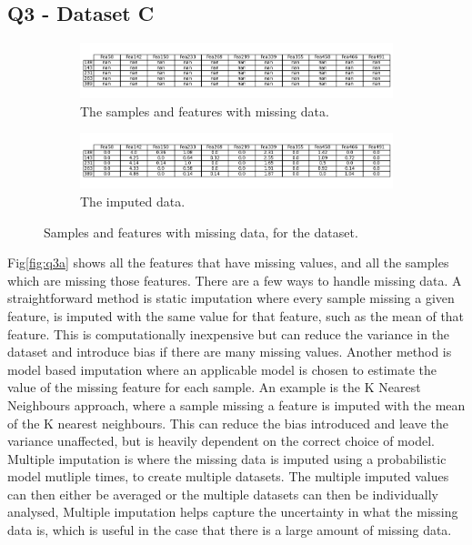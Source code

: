 
\subsection{Q3 - Dataset C}\label{subsec:dataset-c}
    \begin{figure}
    \centering
    \begin{subfigure}{0.9\textwidth}
        \centering
        \includegraphics[width=1\textwidth]{./figures/q3a}
        \caption{The samples and features with missing data.}
        \label{fig:q3a}
    \end{subfigure}%
    \hfill
    \begin{subfigure}{0.9\textwidth}
        \centering
        \includegraphics[width=1\textwidth]{./figures/q3c_1}
        \caption{The imputed data.}
        \label{fig:q3c}
    \end{subfigure}
    \caption{Samples and features with missing data, for the  dataset.}
    \label{fig:q3ac}
    \end{figure}

    Fig\eqref{fig:q3a} shows all the features that have missing values, and all the samples which are missing
    those features.
    There are a few ways to handle missing data.
    A straightforward method is static imputation where every sample missing a given feature, is imputed with the same
    value for that feature, such as the mean of that feature.
    This is computationally inexpensive but can reduce the variance in the dataset and introduce bias if there are many
    missing values.
    Another method is model based imputation where an applicable model is chosen to estimate the value of the missing
    feature for each sample.
    An example is the K Nearest Neighbours approach, where a sample missing a feature is imputed with the mean of the
    K nearest neighbours.
    This can reduce the bias introduced and leave the variance unaffected, but is heavily dependent on the correct
    choice of model.
    Multiple imputation is where the missing data is imputed using a probabilistic model mutliple times, to create
    multiple datasets.
    The multiple imputed values can then either be averaged or the multiple datasets can then be individually analysed,
    Multiple imputation helps capture the uncertainty in what the missing data is, which is useful in the case that
    there is a large amount of missing data.


